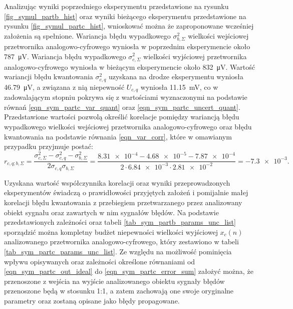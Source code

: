 Analizując wyniki poprzedniego eksperymentu przedstawione na rysunku \ref{fig_symul_partb_hist} oraz wyniki bieżącego eksperymentu przedstawione na rysunku \ref{fig_symul_partc_hist}, wnioskować można że zaproponowane wcześniej założenia są spełnione. Wariancja błędu wypadkowego $\sigma_{b,\Sigma}^{2}$ wielkości wejściowej przetwornika analogowo-cyfrowego wyniosła w poprzednim eksperymencie około \qty{787}{\micro V}. Wariancja błędu wypadkowego $\sigma_{c,\Sigma}^{2}$ wielkości wyjściowej przetwornika analogowo-cyfrowego wyniosła w bieżącym eksperymencie około \qty{832}{\micro V}. Wartość wariancji błędu kwantowania $\sigma_{c,q}^{2}$ uzyskana na drodze eksperymentu wyniosła \qty{46.79}{\micro V}, a związana z nią niepewność $U_{c,q}$ wyniosła \qty{11.15}{mV}, co w zadowalającym stopniu pokrywa się z wartościami wyznaczonymi na podstawie równań \eqref{eqn_sym_partc_var_quant} oraz \eqref{eqn_sym_partc_uncert_quant}. Przedstawione wartości pozwolą określić korelacje pomiędzy wariancją błędu wypadkowego wielkości wejściowej przetwornika analogowo-cyfrowego oraz błędu kwantowania na podstawie równania \eqref{eqn_var_corr}, które w omawianym przypadku przyjmuje postać:
\begin{equation}
r_{c,q;b,\Sigma} = \frac{\sigma_{c,\Sigma}^{2} - \sigma_{c,q}^{2} - \sigma_{b,\Sigma}^{2}}{2 \sigma_{c,q} \sigma_{b,\Sigma}} = \frac{\num{8.31e-4} - \num{4.68e-5} - \num{7.87e-4}}{2 \cdot \num{6.84e-3} \cdot \num{2.81e-2}} = \num{-7.3e-3} \label{eqn_sym_partc_corr}.
\end{equation}

Uzyskana wartość współczynnika korelacji oraz wyniki przeprowadzonych eksperymentów świadczą o prawidłowości przyjętych założeń i pomijalnie małej korelacji błędu kwantowania z przebiegiem przetwarzanego przez analizowany obiekt sygnału oraz zawartych w nim sygnałów błędów. Na podstawie przedstawionych zależności oraz tabeli \ref{tab_sym_partb_params_unc_list} sporządzić można kompletny budżet niepewności wielkości wyjściowej $x_{c}(n)$ analizowanego przetwornika analogowo-cyfrowego, który zestawiono w tabeli \ref{tab_sym_partc_params_unc_list}. Ze względu na możliwość pominięcia wpływu opisywanych oraz zależności określone równaniami od \eqref{eqn_sym_partc_out_ideal} do \eqref{eqn_sym_partc_error_sum} założyć można, że przenoszone z wejścia na wyjście analizowanego obiektu sygnały błędów przenoszone będą w stosunku 1:1, a zatem zachowają one swoje oryginalne parametry oraz zostaną opisane jako błędy propagowane.

